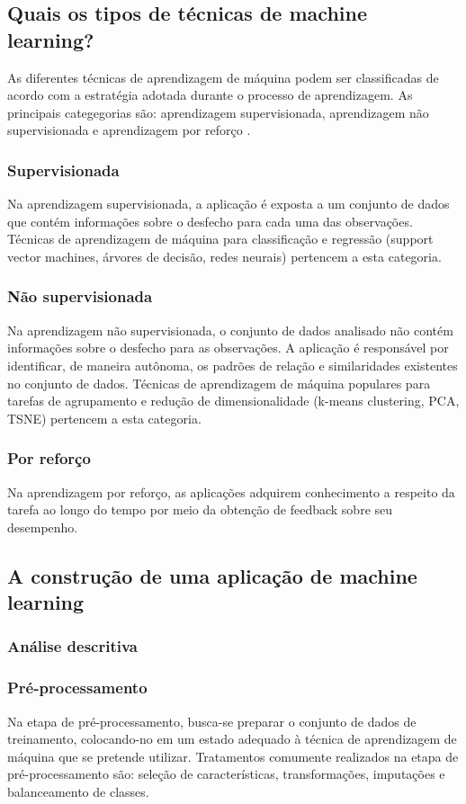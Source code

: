 \subsection{Quais os tipos de técnicas de machine learning?}
As diferentes técnicas de aprendizagem de máquina podem ser classificadas de acordo com a estratégia adotada
durante o processo de aprendizagem. As principais categegorias são: aprendizagem supervisionada, aprendizagem não
supervisionada e aprendizagem por reforço \cite{Bi2019}.

\subsubsection{Supervisionada}
Na aprendizagem supervisionada, a aplicação é exposta a um conjunto de dados que contém informações sobre o desfecho
para cada uma das observações. Técnicas de aprendizagem de máquina para classificação e regressão (support vector machines,
árvores de decisão, redes neurais) pertencem a esta categoria.

\subsubsection{Não supervisionada}
Na aprendizagem não supervisionada, o conjunto de dados analisado não contém informações sobre o desfecho para
as observações. A aplicação é responsável por identificar, de maneira autônoma, os padrões de relação e similaridades existentes
no conjunto de dados. Técnicas de aprendizagem de máquina populares para tarefas de agrupamento e redução de dimensionalidade
(k-means clustering, PCA, TSNE) pertencem a esta categoria.

\subsubsection{Por reforço}
Na aprendizagem por reforço, as aplicações adquirem conhecimento a respeito da tarefa ao longo do tempo por meio da obtenção
de feedback sobre seu desempenho.

\subsection{A construção de uma aplicação de machine learning}
\subsubsection{Análise descritiva}
\subsubsection{Pré-processamento}
Na etapa de pré-processamento, busca-se preparar o conjunto de dados de treinamento, colocando-no em um estado adequado à técnica
de aprendizagem de máquina que se pretende utilizar. Tratamentos comumente realizados na etapa de pré-processamento são: seleção de
características, transformações, imputações e balanceamento de classes.

